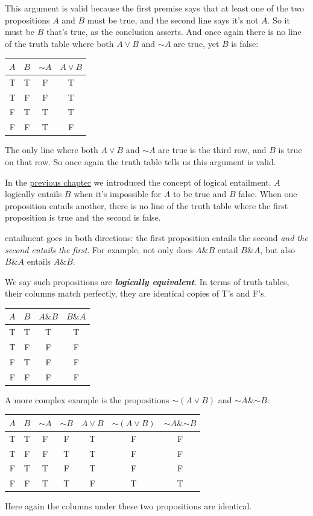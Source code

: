 \documentclass[justified]{tufte-book}
\renewcommand{\neg}{\mathbin{\sim}}
\renewcommand{\wedge}{\mathbin{\&}}
\theoremstyle{definition}
\theoremstyle{definition}
\theoremstyle{definition}
\theoremstyle{remark}
\begin{document}
This argument is valid because the first premise says that at least one of the two propositions \(A\) and \(B\) must be true, and the second line says it's not \(A\). So it must be \(B\) that's true, as the conclusion asserts. And once again there is no line of the truth table where both \(A \vee B\) and \(\neg A\) are true, yet \(B\) is false:
\begin{longtable}[]{@{}cccc@{}}
\toprule
\(A\) & \(B\) & \(\neg A\) & \(A \vee B\)\tabularnewline
\midrule
\endhead
T & T & F & T\tabularnewline
T & F & F & T\tabularnewline
F & T & T & T\tabularnewline
F & F & T & F\tabularnewline
\bottomrule
\end{longtable}
The only line where both \(A \vee B\) and \(\neg A\) are true is the third row, and \(B\) is true on that row. So once again the truth table tells us this argument is valid.

In the \protect\hyperlink{visualizing-propositions}{previous chapter} we introduced the concept of logical entailment. \(A\) logically entails \(B\) when it's impossible for \(A\) to be true and \(B\) false. When one proposition entails another, there is no line of the truth table where the first proposition is true and the second is false.

 entailment goes in both directions: the first proposition entails the second \emph{and the second entails the first}. For example, not only does \(A \wedge B\) entail \(B \wedge A\), but also \(B \wedge A\) entails \(A \wedge B\).

We say such propositions are \textbf{\emph{logically equivalent}}. In terms of truth tables, their columns match perfectly, they are identical copies of T's and F's.

\begin{longtable}[]{@{}cccc@{}}
\toprule
\(A\) & \(B\) & \(A \wedge B\) & \(B \wedge A\)\tabularnewline
\midrule
\endhead
T & T & T & T\tabularnewline
T & F & F & F\tabularnewline
F & T & F & F\tabularnewline
F & F & F & F\tabularnewline
\bottomrule
\end{longtable}

A more complex example is the propositions \(\neg (A \vee B)\) and \(\neg A \wedge \neg B\):
\begin{longtable}[]{@{}ccccccc@{}}
\toprule
\(A\) & \(B\) & \(\neg A\) & \(\neg B\) & \(A \vee B\) & \(\neg(A \vee B)\) & \(\neg A \wedge \neg B\)\tabularnewline
\midrule
\endhead
T & T & F & F & T & F & F\tabularnewline
T & F & F & T & T & F & F\tabularnewline
F & T & T & F & T & F & F\tabularnewline
F & F & T & T & F & T & T\tabularnewline
\bottomrule
\end{longtable}
\noindent Here again the columns under these two propositions are identical.
\end{document}
